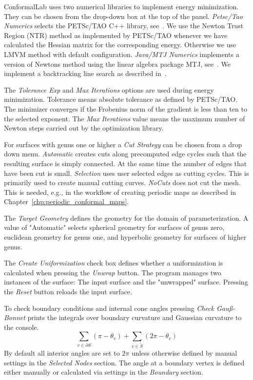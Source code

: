 \documentclass[Thesis.tex]{subfiles}
\begin{document}
{\sc ConformalLab} uses two numerical libraries to implement energy minimization. 
They can be chosen from the drop-down box at the top of the panel. 
\emph{Petsc/Tao Numerics} selects the {\sc PETSc/TAO} C++ library, see~\cite{petsc-web-page, tao-user-ref}. 
We use the Newton Trust Region (NTR) method as implemented by {\sc PETSc/TAO} whenever we have calculated the Hessian matrix for the corresponding energy. 
Otherwise we use LMVM method with default configuration. 
\emph{Java/MTJ Numerics} implements a version of Newtons method using the linear algebra package MTJ, see~\cite{mtj-website}. 
We implement a backtracking line search as described in~\cite[pp.~464]{boyd2004convex}.

The \emph{Tolerance Exp} and \emph{Max Iterations} options are used during energy minimization. 
Tolerance means absolute tolerance as defined by {\sc PETSc/TAO}. 
The minimizer converges if the Frobenius norm of the gradient is less than ten to the selected exponent. The \emph{Max Iterations} value means the maximum number of Newton steps carried out by the optimization library.

For surfaces with genus one or higher a \emph{Cut Strategy} can be chosen from a drop down menu. 
\emph{Automatic} creates cuts along precomputed edge cycles such that the resulting surface is simply connected. 
At the same time the number of edges that have been cut is small. 
\emph{Selection} uses user selected edges as cutting cycles. 
This is primarily used to create manual cutting curves. 
\emph{NoCuts} does not cut the mesh. 
This is needed, e.g., in the workflow of creating periodic maps as described in Chapter~\ref{chp:periodic_conformal_maps}.

The \emph{Target Geometry} defines the geometry for the domain of parameterization. 
A value of "Automatic" selects spherical geometry for surfaces of genus zero, euclidean geometry for genus one, and hyperbolic geometry for surfaces of higher genus.

The \emph{Create Uniformization} check box defines whether a uniformization is calculated when pressing the \emph{Unwrap} button. 
The program manages two instances of the surface: The input surface and the "unwrapped" surface. Pressing the \emph{Reset} button reloads the input surface.

To check boundary conditions and internal cone angles pressing \emph{Check Gau\ss-Bonnet} prints the integrals over boundary curvature and Gaussian curvature to the console. 
\[\sum_{v \in \partial S} \left(\pi - \theta_v\right) + \sum_{v \in \mathring{S}}\left(2\pi - \theta_v\right)\]
By default all interior angles are set to $2\pi$ unless otherwise defined by manual settings in the \emph{Selected Nodes} section. The angle at a boundary vertex is defined either manually or calculated via settings in the \emph{Boundary} section.
\end{document}
